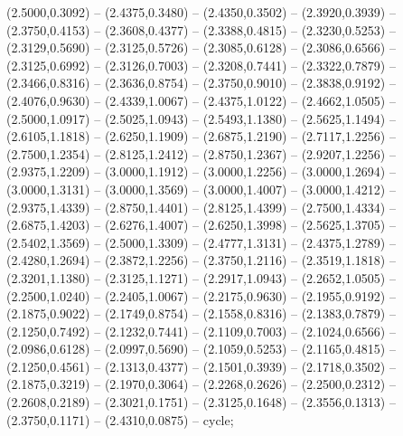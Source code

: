 {(2.5000,0.3092) -- (2.4375,0.3480) -- (2.4350,0.3502) -- (2.3920,0.3939) -- (2.3750,0.4153) -- (2.3608,0.4377) -- (2.3388,0.4815) -- (2.3230,0.5253) -- (2.3129,0.5690) -- (2.3125,0.5726) -- (2.3085,0.6128) -- (2.3086,0.6566) -- (2.3125,0.6992) -- (2.3126,0.7003) -- (2.3208,0.7441) -- (2.3322,0.7879) -- (2.3466,0.8316) -- (2.3636,0.8754) -- (2.3750,0.9010) -- (2.3838,0.9192) -- (2.4076,0.9630) -- (2.4339,1.0067) -- (2.4375,1.0122) -- (2.4662,1.0505) -- (2.5000,1.0917) -- (2.5025,1.0943) -- (2.5493,1.1380) -- (2.5625,1.1494) -- (2.6105,1.1818) -- (2.6250,1.1909) -- (2.6875,1.2190) -- (2.7117,1.2256) -- (2.7500,1.2354) -- (2.8125,1.2412) -- (2.8750,1.2367) -- (2.9207,1.2256) -- (2.9375,1.2209) -- (3.0000,1.1912) -- (3.0000,1.2256) -- (3.0000,1.2694) -- (3.0000,1.3131) -- (3.0000,1.3569) -- (3.0000,1.4007) -- (3.0000,1.4212) -- (2.9375,1.4339) -- (2.8750,1.4401) -- (2.8125,1.4399) -- (2.7500,1.4334) -- (2.6875,1.4203) -- (2.6276,1.4007) -- (2.6250,1.3998) -- (2.5625,1.3705) -- (2.5402,1.3569) -- (2.5000,1.3309) -- (2.4777,1.3131) -- (2.4375,1.2789) -- (2.4280,1.2694) -- (2.3872,1.2256) -- (2.3750,1.2116) -- (2.3519,1.1818) -- (2.3201,1.1380) -- (2.3125,1.1271) -- (2.2917,1.0943) -- (2.2652,1.0505) -- (2.2500,1.0240) -- (2.2405,1.0067) -- (2.2175,0.9630) -- (2.1955,0.9192) -- (2.1875,0.9022) -- (2.1749,0.8754) -- (2.1558,0.8316) -- (2.1383,0.7879) -- (2.1250,0.7492) -- (2.1232,0.7441) -- (2.1109,0.7003) -- (2.1024,0.6566) -- (2.0986,0.6128) -- (2.0997,0.5690) -- (2.1059,0.5253) -- (2.1165,0.4815) -- (2.1250,0.4561) -- (2.1313,0.4377) -- (2.1501,0.3939) -- (2.1718,0.3502) -- (2.1875,0.3219) -- (2.1970,0.3064) -- (2.2268,0.2626) -- (2.2500,0.2312) -- (2.2608,0.2189) -- (2.3021,0.1751) -- (2.3125,0.1648) -- (2.3556,0.1313) -- (2.3750,0.1171) -- (2.4310,0.0875) -- cycle;
}
